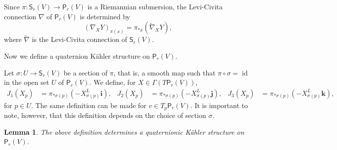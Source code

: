 \documentclass[12pt, a4paper]{amsart}
\newcommand{\id}{\operatorname{id}}
\newtheorem{lemma}[theorem]{Lemma}
\theoremstyle{remark}
\begin{document}
Since $\pi\colon\mathsf{S}_r(V)\to\mathsf{P}_r(V)$ is a Riemannian submersion, the Levi-Civita connection $\nabla$ of $\mathsf{P}_r(V)$ is determined by~\cite{ONeill}
\[
(\nabla_X Y)_{\pi(x)}=\pi_{*x}(\tilde{\nabla}_X Y),
\]
where $\tilde{\nabla}$ is the Levi-Civita connection of $\mathsf{S}_r(V)$.
\medskip

Now we define a quaternion K\"ahler structure on $\mathsf{P}_r(V)$.

Let $\sigma\colon U\to\mathsf{S}_r(V)$ be a section of $\pi$, that is, a smooth map such that $\pi\circ\sigma=\id$ in the open set $U$ of $\mathsf{P}_r(V)$.
We define, for $X\in\Gamma(T\mathsf{P}_r(V))$,
\[
\begin{aligned}
J_1(X_p)&{}=\pi_{*\sigma(p)}(-X_{\sigma(p)}^L\mathbf{i}),
&J_2(X_p)&{}=\pi_{*\sigma(p)}(-X_{\sigma(p)}^L\mathbf{j}),
&J_3(X_p)&{}=\pi_{*\sigma(p)}(-X_{\sigma(p)}^L\mathbf{k}),
\end{aligned}
\]
for $p\in U$.
The same definition can be made for $v\in T_p\mathsf{P}_r(V)$.
It is important to note, however, that this definition depends on the choice of section $\sigma$.

\begin{lemma}
The above definition determines a quaternionic K\"ahler structure on $\mathsf{P}_r(V)$.
\end{lemma}
\end{document}
